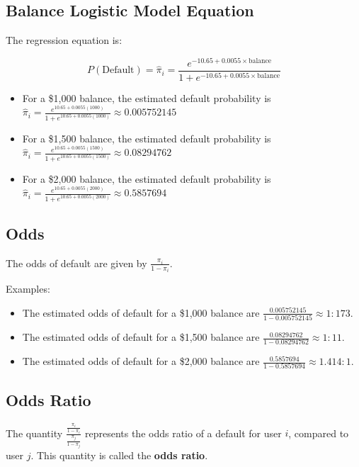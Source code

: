 \documentclass[]{book}
\begin{document}
\subsection{Balance Logistic Model
Equation}\label{balance-logistic-model-equation}

The regression equation is:

\[
P(\text{Default}) = \hat{\pi}_i =  \frac{e^{-10.65+0.0055\times\text{balance}}}{1+e^{-10.65+0.0055\times\text{balance}}}
\]

\begin{itemize}
\item
  For a \$1,000 balance, the estimated default probability is
  \(\hat{\pi}_i=\frac{e^{10.65+0.0055(1000) }}{1+e^{10.65+0.0055(1000)}} \approx 0.005752145\)
\item
  For a \$1,500 balance, the estimated default probability is
  \(\hat{\pi}_i=\frac{e^{10.65+0.0055(1500) }}{1+e^{10.65+0.0055(1500)}} \approx 0.08294762\)
\item
  For a \$2,000 balance, the estimated default probability is
  \(\hat{\pi}_i=\frac{e^{10.65+0.0055(2000) }}{1+e^{10.65+0.0055(2000)}} \approx 0.5857694\)
\end{itemize}

\subsection{Odds}\label{odds}

The odds of default are given by \(\frac{\pi_i}{1-\pi_i}\).

Examples:

\begin{itemize}
\item
  The estimated odds of default for a \$1,000 balance are
  \(\frac{0.005752145}{1-0.005752145} \approx 1:173.\)
\item
  The estimated odds of default for a \$1,500 balance are
  \(\frac{0.08294762 }{1-0.08294762 } \approx 1:11.\)
\item
  The estimated odds of default for a \$2,000 balance are
  \(\frac{0.5857694}{1-0.5857694} \approx 1.414:1.\)
\end{itemize}

\subsection{Odds Ratio}\label{odds-ratio}

The quantity \(\frac{\frac{\pi_i}{1-\pi_i}}{\frac{\pi_j}{1-\pi_j}}\)
represents the odds ratio of a default for user \(i\), compared to user
\(j\). This quantity is called the \textbf{odds ratio}.
\end{document}

